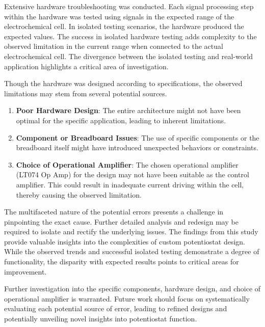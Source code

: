 \documentclass{article}
\begin{document}
Extensive hardware troubleshooting was conducted. Each signal processing step within the hardware was tested using signals in the expected range of the electrochemical cell. In isolated testing scenarios, the hardware produced the expected values. The success in isolated hardware testing adds complexity to the observed limitation in the current range when connected to the actual electrochemical cell. The divergence between the isolated testing and real-world application highlights a critical area of investigation.

Though the hardware was designed according to specifications, the observed limitations may stem from several potential sources.
\begin{enumerate}
    \item \textbf{Poor Hardware Design}: The entire architecture might not have been optimal for the specific application, leading to inherent limitations.
    \item \textbf{Component or Breadboard Issues}: The use of specific components or the breadboard itself might have introduced unexpected behaviors or constraints.
    \item \textbf{Choice of Operational Amplifier}: The chosen operational amplifier (LT074 Op Amp) for the design may not have been suitable as the control amplifier. This could result in inadequate current driving within the cell, thereby causing the observed limitation.
\end{enumerate}

The multifaceted nature of the potential errors presents a challenge in pinpointing the exact cause. Further detailed analysis and redesign may be required to isolate and rectify the underlying issues. The findings from this study provide valuable insights into the complexities of custom potentiostat design. While the observed trends and successful isolated testing demonstrate a degree of functionality, the disparity with expected results points to critical areas for improvement.

Further investigation into the specific components, hardware design, and choice of operational amplifier is warranted. Future work should focus on systematically evaluating each potential source of error, leading to refined designs and potentially unveiling novel insights into potentiostat function.
\end{document}

